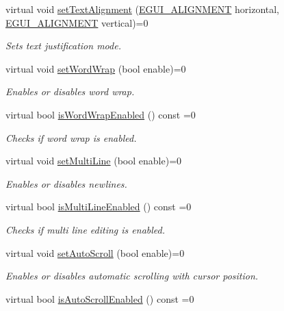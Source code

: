 \begin{DoxyCompactItemize}
virtual void \hyperlink{classirr_1_1gui_1_1IGUIEditBox_ab1e2379940983f4ff874f5143f6d7244}{set\+Text\+Alignment} (\hyperlink{namespaceirr_1_1gui_a19eb5fb40e67f108cb16aba922ddaa2d}{E\+G\+U\+I\+\_\+\+A\+L\+I\+G\+N\+M\+E\+NT} horizontal, \hyperlink{namespaceirr_1_1gui_a19eb5fb40e67f108cb16aba922ddaa2d}{E\+G\+U\+I\+\_\+\+A\+L\+I\+G\+N\+M\+E\+NT} vertical)=0
\begin{DoxyCompactList}\small\item\em Sets text justification mode. \end{DoxyCompactList}\item 
virtual void \hyperlink{classirr_1_1gui_1_1IGUIEditBox_aa020a985b38d293794b73e6e12dafd7c}{set\+Word\+Wrap} (bool enable)=0
\begin{DoxyCompactList}\small\item\em Enables or disables word wrap. \end{DoxyCompactList}\item 
virtual bool \hyperlink{classirr_1_1gui_1_1IGUIEditBox_ad0fd4782c052341744ea9d1f61f80e01}{is\+Word\+Wrap\+Enabled} () const =0
\begin{DoxyCompactList}\small\item\em Checks if word wrap is enabled. \end{DoxyCompactList}\item 
virtual void \hyperlink{classirr_1_1gui_1_1IGUIEditBox_a0f68dc7ddc74d8103ba3ba4d445dbf9a}{set\+Multi\+Line} (bool enable)=0
\begin{DoxyCompactList}\small\item\em Enables or disables newlines. \end{DoxyCompactList}\item 
virtual bool \hyperlink{classirr_1_1gui_1_1IGUIEditBox_a0be3338bc094fc93c9f0e4ed842835d6}{is\+Multi\+Line\+Enabled} () const =0
\begin{DoxyCompactList}\small\item\em Checks if multi line editing is enabled. \end{DoxyCompactList}\item 
virtual void \hyperlink{classirr_1_1gui_1_1IGUIEditBox_ad0a9db6da9d0594bb3b5b85a673b3e4d}{set\+Auto\+Scroll} (bool enable)=0
\begin{DoxyCompactList}\small\item\em Enables or disables automatic scrolling with cursor position. \end{DoxyCompactList}\item 
virtual bool \hyperlink{classirr_1_1gui_1_1IGUIEditBox_a4ccf066d1198f3548c7d04622067917f}{is\+Auto\+Scroll\+Enabled} () const =0

\end{DoxyCompactItemize}
